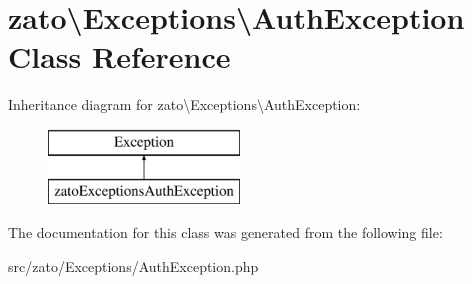 \hypertarget{classzato_1_1_exceptions_1_1_auth_exception}{}\section{zato\textbackslash{}Exceptions\textbackslash{}Auth\+Exception Class Reference}
\label{classzato_1_1_exceptions_1_1_auth_exception}
Inheritance diagram for zato\textbackslash{}Exceptions\textbackslash{}Auth\+Exception\+:\begin{figure}[H]
\begin{center}
\leavevmode
\includegraphics[height=2.000000cm]{classzato_1_1_exceptions_1_1_auth_exception}
\end{center}
\end{figure}


The documentation for this class was generated from the following file\+:\begin{DoxyCompactItemize}
\item 
src/zato/\+Exceptions/Auth\+Exception.\+php\end{DoxyCompactItemize}
